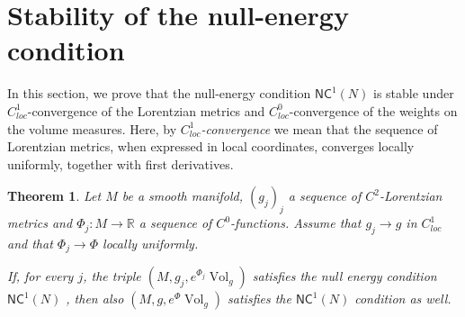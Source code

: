 \documentclass[12pt,a4paper]{amsart}
\theoremstyle{plain}
\newtheorem{theorem}[lemma]{Theorem}
\theoremstyle{definition}
\numberwithin{equation}{section}
\newcommand{\R}{\mathbb{R}}
\DeclareMathOperator{\vol}{Vol}
\newcommand{\NC}{\mathsf{NC}}
\begin{document}
\section{Stability of the null-energy condition}
\label{S:stability}

In this section, we prove that the null-energy condition $\NC^1(N)$ is stable under
$C^1_{loc}$-con\-ver\-gence of the Lorentzian metrics and $C^0_{loc}$-convergence of the weights on the volume measures.
%
Here, by \emph{$C^1_{loc}$-convergence} we mean that the sequence of Lorentzian metrics, when expressed
in local coordinates, converges locally uniformly, together with first
derivatives.


\begin{theorem}
  \label{th:stability}
  Let $M$ be a smooth manifold, $(g_j)_j$ a sequence of $C^2$-Lorentzian metrics
  and $\Phi_j:M\to\R$ a sequence of $C^0$-functions.  %
  Assume that $g_j\to g$ in $C^1_{loc}$ and that $\Phi_j\to \Phi$ locally
  uniformly.

  If, for every $j$, the triple $(M,g_j,e^{\Phi_j}\vol_g)$ satisfies the
   null energy condition $\NC^1(N)$ , then also
  $(M,g,e^{\Phi}\vol_g)$ satisfies the $\NC^1(N)$ condition as well.
\end{theorem}
\end{document}
